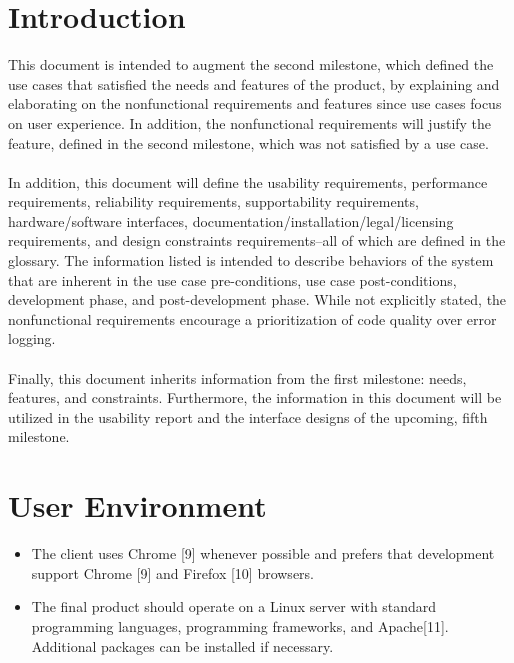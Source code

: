 \documentclass{article}
\begin{document}
\section{Introduction}
This document is intended to augment the second milestone, which defined the use cases that satisfied the needs and features of the product, by explaining and elaborating on the nonfunctional requirements and features since use cases focus on user experience.  In addition, the nonfunctional requirements will justify the feature, defined in the second milestone, which was not satisfied by a use case.\\
~\\
In addition, this document will define the usability requirements, performance requirements, reliability requirements, supportability requirements, hardware/software interfaces, documentation/installation/legal/licensing requirements, and design constraints requirements--all of which are defined in the glossary.  The information listed is intended to describe behaviors of the system that are inherent in the use case pre-conditions, use case post-conditions, development phase, and post-development phase.  While not explicitly stated, the nonfunctional requirements encourage a prioritization of code quality over error logging.\\
~\\
Finally, this document inherits information from the first milestone:  needs, features, and constraints.  Furthermore, the information in this document will be utilized in the usability report and the interface designs of the upcoming, fifth milestone.

\section{User Environment}
\begin{itemize}
\item The client uses Chrome [9] whenever possible and prefers that development support Chrome [9] and Firefox [10] browsers.
\item The final product should operate on a Linux server with standard programming languages, programming frameworks, and Apache[11].  Additional packages can be installed if necessary.
\end{itemize}
\end{document}
